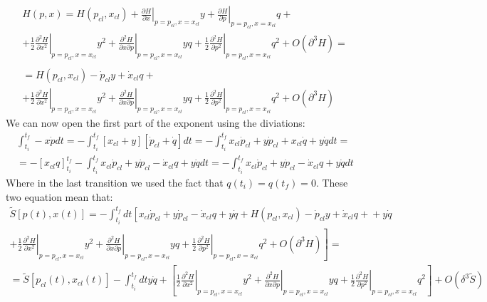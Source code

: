 \documentclass{article}
\begin{document}
\begin{equation}
\begin{gathered}
    H(p,x) = H(p_{cl}, x_{cl}) +
        \left.\frac{\partial H}{\partial x}\right|_{p=p_{cl}, x=x_{cl}}y + \left.\frac{\partial H}{\partial p}\right|_{p=p_{cl}, x=x_{cl}}q +
        \\
        +  \left.\frac{1}{2}\frac{\partial^2 H}{\partial x^2}\right|_{p=p_{cl}, x=x_{cl}}y^2
        +  \left.\frac{\partial^2 H}{\partial x\partial p}\right|_{p=p_{cl}, x=x_{cl}}yq
        +  \left.\frac{1}{2}\frac{\partial^2 H}{\partial p^2}\right|_{p=p_{cl}, x=x_{cl}}q^2 + O(\partial^3 H) = 
        \\
        \\
        = H(p_{cl}, x_{cl}) -
        \dot{p}_{cl}y + \dot{x}_{cl}q +
        \\
        +  \left.\frac{1}{2}\frac{\partial^2 H}{\partial x^2}\right|_{p=p_{cl}, x=x_{cl}}y^2
        +  \left.\frac{\partial^2 H}{\partial x\partial p}\right|_{p=p_{cl}, x=x_{cl}}yq
        +  \left.\frac{1}{2}\frac{\partial^2 H}{\partial p^2}\right|_{p=p_{cl}, x=x_{cl}}q^2 + O(\partial^3 H)
\end{gathered}
\end{equation}
We can now open the first part of the exponent using the diviations:
\begin{equation}
\begin{gathered}
    \int_{t_i}^{t_f} -x\dot{p} dt = -\int_{t_i}^{t_f} \left[x_{cl} + y\right]\left[\dot{p}_{cl} + \dot{q}\right] dt
    = -\int_{t_i}^{t_f} x_{cl}\dot{p}_{cl} + y\dot{p}_{cl} + x_{cl}\dot{q} + y\dot{q} dt =
    \\
    = -\left[x_{cl}q\right]_{t_i}^{t_f}-\int_{t_i}^{t_f} x_{cl}\dot{p}_{cl} + y\dot{p}_{cl} - \dot{x}_{cl}q + y\dot{q} dt
    = -\int_{t_i}^{t_f} x_{cl}\dot{p}_{cl} + y\dot{p}_{cl} - \dot{x}_{cl}q + y\dot{q} dt
\end{gathered}
\end{equation}
Where in the last transition we used the fact that $q(t_i) = q(t_f) = 0$.
These two equation mean that:
\begin{equation}
\begin{gathered}
    \tilde{S}\left[p(t),x(t)\right] = -\int_{t_i}^{t_f} dt \left[ x_{cl}\dot{p}_{cl} + y\dot{p}_{cl} - \dot{x}_{cl}q + y\dot{q} + H(p_{cl}, x_{cl}) -
    \dot{p}_{cl}y + \dot{x}_{cl}q + \right. + y\dot{q}
    \\ \left.
    +  \left.\frac{1}{2}\frac{\partial^2 H}{\partial x^2}\right|_{p=p_{cl}, x=x_{cl}}y^2
    +  \left.\frac{\partial^2 H}{\partial x\partial p}\right|_{p=p_{cl}, x=x_{cl}}yq
    +  \left.\frac{1}{2}\frac{\partial^2 H}{\partial p^2}\right|_{p=p_{cl}, x=x_{cl}}q^2 + O(\partial^3 H) \right]
    = \\ = \tilde{S}\left[p_{cl}(t), x_{cl}(t)\right] - \int_{t_i}^{t_f} dt y\dot{q} + \left[\left.\frac{1}{2}\frac{\partial^2 H}{\partial x^2}\right|_{p=p_{cl}, x=x_{cl}}y^2
    +  \left.\frac{\partial^2 H}{\partial x\partial p}\right|_{p=p_{cl}, x=x_{cl}}yq
    +  \left.\frac{1}{2}\frac{\partial^2 H}{\partial p^2}\right|_{p=p_{cl}, x=x_{cl}}q^2\right] + O(\delta^3\tilde{S})
\end{gathered}
\end{equation}
\end{document}
